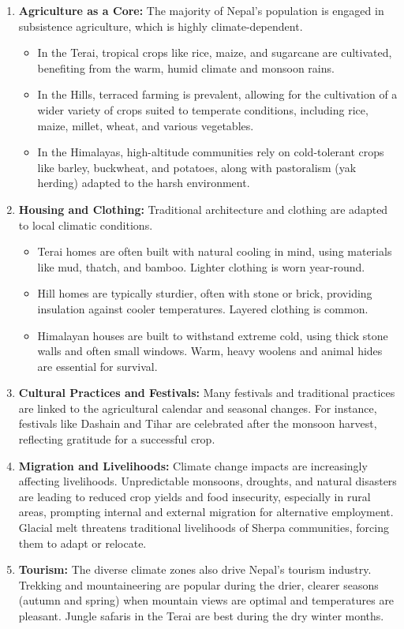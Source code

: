 \begin{enumerate}
  \item \textbf{Agriculture as a Core:} The majority of Nepal's population is engaged in subsistence agriculture, which is highly climate-dependent.
    \begin{itemize}
      \item In the Terai, tropical crops like rice, maize, and sugarcane are cultivated, benefiting from the warm, humid climate and monsoon rains.
      \item In the Hills, terraced farming is prevalent, allowing for the cultivation of a wider variety of crops suited to temperate conditions, including rice, maize, millet, wheat, and various vegetables.
      \item In the Himalayas, high-altitude communities rely on cold-tolerant crops like barley, buckwheat, and potatoes, along with pastoralism (yak herding) adapted to the harsh environment.
    \end{itemize}
  \item \textbf{Housing and Clothing:} Traditional architecture and clothing are adapted to local climatic conditions.
    \begin{itemize}
      \item Terai homes are often built with natural cooling in mind, using materials like mud, thatch, and bamboo. Lighter clothing is worn year-round.
      \item Hill homes are typically sturdier, often with stone or brick, providing insulation against cooler temperatures. Layered clothing is common.
      \item Himalayan houses are built to withstand extreme cold, using thick stone walls and often small windows. Warm, heavy woolens and animal hides are essential for survival.
    \end{itemize}
  \item \textbf{Cultural Practices and Festivals:} Many festivals and traditional practices are linked to the agricultural calendar and seasonal changes. For instance, festivals like Dashain and Tihar are celebrated after the monsoon harvest, reflecting gratitude for a successful crop.
  \item \textbf{Migration and Livelihoods:} Climate change impacts are increasingly affecting livelihoods. Unpredictable monsoons, droughts, and natural disasters are leading to reduced crop yields and food insecurity, especially in rural areas, prompting internal and external migration for alternative employment. Glacial melt threatens traditional livelihoods of Sherpa communities, forcing them to adapt or relocate.
  \item \textbf{Tourism:} The diverse climate zones also drive Nepal's tourism industry. Trekking and mountaineering are popular during the drier, clearer seasons (autumn and spring) when mountain views are optimal and temperatures are pleasant. Jungle safaris in the Terai are best during the dry winter months.
\end{enumerate}

